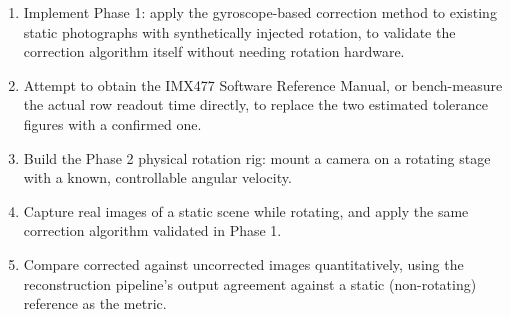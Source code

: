 \begin{enumerate}[leftmargin=*]
    \item Implement Phase 1: apply the gyroscope-based correction method to existing static photographs with synthetically injected rotation, to validate the correction algorithm itself without needing rotation hardware.
    \item Attempt to obtain the IMX477 Software Reference Manual, or bench-measure the actual row readout time directly, to replace the two estimated tolerance figures with a confirmed one.
    \item Build the Phase 2 physical rotation rig: mount a camera on a rotating stage with a known, controllable angular velocity.
    \item Capture real images of a static scene while rotating, and apply the same correction algorithm validated in Phase 1.
    \item Compare corrected against uncorrected images quantitatively, using the reconstruction pipeline's output agreement against a static (non-rotating) reference as the metric.
\end{enumerate}
